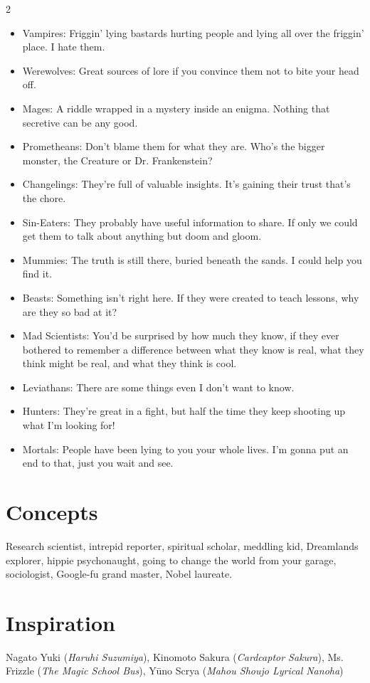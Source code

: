 \begin{multicols}{2}
\begin{itemize}
\item Vampires: Friggin' lying bastards hurting people and lying all over the friggin' place. I hate them.
\item Werewolves: Great sources of lore if you convince them not to bite your head off.
\item Mages: A riddle wrapped in a mystery inside an enigma. Nothing that secretive can be any good. 
\item Prometheans: Don't blame them for what they are. Who's the bigger monster, the Creature or Dr. Frankenstein?
\item Changelings: They're full of valuable insights. It's gaining their trust that's the chore.
\item Sin-Eaters: They probably have useful information to share. If only we could get them to talk about anything but doom and gloom.
\item Mummies: The truth is still there, buried beneath the sands. I could help you find it.
\item Beasts: Something isn't right here. If they were created to teach lessons, why are they so bad at it?

\item Mad Scientists: You'd be surprised by how much they know, if they ever bothered to remember a difference between what they know is real, what they think might be real, and what they think is cool.
\item Leviathans: There are some things even I don't want to know.

\item Hunters: They're great in a fight, but half the time they keep shooting up what I'm looking for!
\item Mortals: People have been lying to you your whole lives. I'm gonna put an end to that, just you wait and see. 

\end{itemize}

\section*{Concepts}
Research scientist, intrepid reporter, spiritual scholar, meddling kid, Dreamlands explorer, hippie psychonaught, going to change the world from your garage, sociologist, Google-fu grand master, Nobel laureate.

\section*{Inspiration}
Nagato Yuki (\textit{Haruhi Suzumiya}), Kinomoto Sakura (\textit{Cardcaptor Sakura}), Ms. Frizzle (\textit{The Magic School Bus}), Yūno Scrya (\textit{Mahou Shoujo Lyrical Nanoha})


\end{multicols}
